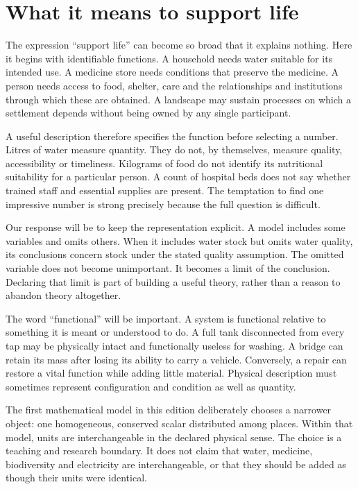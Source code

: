 \section{What it means to support life}
The expression ``support life'' can become so broad that it explains nothing. Here it begins with identifiable functions. A household needs water suitable for its intended use. A medicine store needs conditions that preserve the medicine. A person needs access to food, shelter, care and the relationships and institutions through which these are obtained. A landscape may sustain processes on which a settlement depends without being owned by any single participant.

A useful description therefore specifies the function before selecting a number. Litres of water measure quantity. They do not, by themselves, measure quality, accessibility or timeliness. Kilograms of food do not identify its nutritional suitability for a particular person. A count of hospital beds does not say whether trained staff and essential supplies are present. The temptation to find one impressive number is strong precisely because the full question is difficult.

Our response will be to keep the representation explicit. A model includes some variables and omits others. When it includes water stock but omits water quality, its conclusions concern stock under the stated quality assumption. The omitted variable does not become unimportant. It becomes a limit of the conclusion. Declaring that limit is part of building a useful theory, rather than a reason to abandon theory altogether.

The word ``functional'' will be important. A system is functional relative to something it is meant or understood to do. A full tank disconnected from every tap may be physically intact and functionally useless for washing. A bridge can retain its mass after losing its ability to carry a vehicle. Conversely, a repair can restore a vital function while adding little material. Physical description must sometimes represent configuration and condition as well as quantity.

The first mathematical model in this edition deliberately chooses a narrower object: one homogeneous, conserved scalar distributed among places. Within that model, units are interchangeable in the declared physical sense. The choice is a teaching and research boundary. It does not claim that water, medicine, biodiversity and electricity are interchangeable, or that they should be added as though their units were identical.

